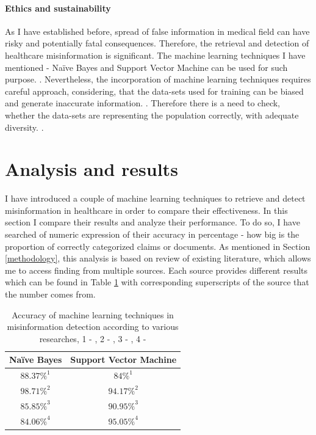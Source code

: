 \documentclass[11pt ,english,a4paper]{article}
\begin{document}
\paragraph{Ethics and sustainability}%
As I have established before, spread of false information in medical field can have risky and potentially fatal consequences. Therefore, the retrieval and detection of healthcare misinformation is significant. The machine learning techniques I have mentioned - Naïve Bayes and Support Vector Machine can be used for such purpose. \cite{chap22unmask}. Nevertheless, the incorporation of machine learning techniques requires careful approach, considering, that the data-sets used for training can be biased and generate inaccurate information. \cite{who21ethics}. Therefore there is a need to check, whether the data-sets are representing the population correctly, with adequate diversity. \cite{sch23aut}.

\section{Analysis and results}\label{analysis}
I have introduced a couple of machine learning techniques to retrieve and detect misinformation in healthcare in order to compare their effectiveness. In this section I compare their results and analyze their performance. To do so, I have searched of numeric expression of their accuracy in percentage - how big is the proportion of correctly categorized claims or documents. As mentioned in Section \ref{methodology}, this analysis is based on review of existing literature, which allows me to access finding from multiple sources. Each source provides different results which can be found in Table \ref{table:results} with corresponding superscripts of the source that the number comes from. 

\begin{table}[H]
\centering
\begin{tabular}{||c c||} 
 \hline
Naïve Bayes & Support Vector Machine\\ [0.5ex] 
 \hline\hline
 $88.37\%^{1}$ & $84\%^{1}$  \\
 \hline
 $98.71\%^{2}$ & $94.17\%^{2}$  \\
 \hline
 $85.85\%^{3}$ & $90.95\%^{3}$  \\
 \hline
 $84.06\%^{4}$ & $95.05\%^{4}$  \\ [1ex]
 \hline
\end{tabular}
\caption{\centering Accuracy of machine learning techniques in misinformation detection according to various researches, 1 - \cite{chap22unmask}, 2 - \cite{bar21health}, 3 - \cite{pod19mach}, 4 - \cite{sha20mach}}
\label{table:results}
\end{table}
\end{document}
